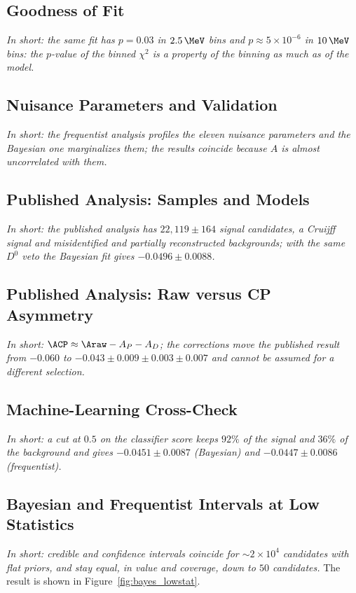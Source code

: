\subsection{Goodness of Fit}
\emph{In short: the same fit has $p=0.03$ in $2.5\,\MeV$ bins and $p\approx5\times10^{-6}$ in $10\,\MeV$ bins: the $p$-value of the binned $\chi^2$ is a property of the binning as much as of the model.}

\subsection{Nuisance Parameters and Validation}
\emph{In short: the frequentist analysis profiles the eleven nuisance parameters and the Bayesian one marginalizes them; the results coincide because $A$ is almost uncorrelated with them.}

\subsection{Published Analysis: Samples and Models}
\emph{In short: the published analysis has $22{,}119\pm164$ signal candidates, a Cruijff signal and misidentified and partially reconstructed backgrounds; with the same $D^0$ veto the Bayesian fit gives $-0.0496\pm0.0088$.}

\subsection{Published Analysis: Raw versus CP Asymmetry}
\emph{In short: $\ACP\approx\Araw-A_P-A_D$; the corrections move the published result from $-0.060$ to $-0.043\pm0.009\pm0.003\pm0.007$ and cannot be assumed for a different selection.}

\subsection{Machine-Learning Cross-Check}
\emph{In short: a cut at $0.5$ on the classifier score keeps $92\%$ of the signal and $36\%$ of the background and gives $-0.0451\pm0.0087$ (Bayesian) and $-0.0447\pm0.0086$ (frequentist).}

\subsection{Bayesian and Frequentist Intervals at Low Statistics}
\label{sec:bayes_lowstat}
\emph{In short: credible and confidence intervals coincide for $\sim2\times10^4$ candidates with flat priors, and stay equal, in value and coverage, down to $50$ candidates.}
The result is shown in Figure~\ref{fig:bayes_lowstat}.

